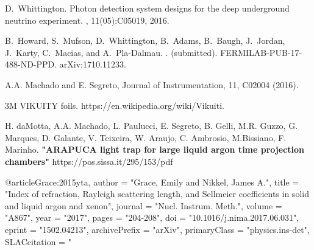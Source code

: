 



\begin{thebibliography}{1}
D.~Whittington.
\newblock Photon detection system designs for the deep underground neutrino
  experiment.
, 11(05):C05019, 2016.

B.~Howard, S.~Mufson, D.~Whittington, B.~Adams, B.~Baugh, J.~Jordan, J.~Karty,
  C.~Macias, and A.~Pla-Dalmau.
.
 (submitted).
\newblock FERMILAB-PUB-17-488-ND-PPD.
\newblock arXiv:1710.11233.

\end{thebibliography}





\begin{thebibliography}{99}
\footnotesize{

 A.A. Machado and E. Segreto, Journal of Instrumentation, 11, C02004 (2016).

	3M VIKUITY foils. https://en.wikipedia.org/wiki/Vikuiti.
    
 H. daMotta, A.A. Machado, L. Paulucci, E. Segreto, B. Gelli, M.R. Guzzo, G. Marques, D. Galante, V. Teixeira, W. Araujo, C. Ambrosio, M.Bissiano, F. Marinho. {\bf"ARAPUCA light trap for large liquid argon time projection chambers"}
    https://pos.sissa.it/295/153/pdf

}
\end{thebibliography}




@article{Grace:2015yta,
      author         = "Grace, Emily and Nikkel, James A.",
      title          = "{Index of refraction, Rayleigh scattering length, and
                        Sellmeier coefficients in solid and liquid argon and
                        xenon}",
      journal        = "Nucl. Instrum. Meth.",
      volume         = "A867",
      year           = "2017",
      pages          = "204-208",
      doi            = "10.1016/j.nima.2017.06.031",
      eprint         = "1502.04213",
      archivePrefix  = "arXiv",
      primaryClass   = "physics.ins-det",
      SLACcitation   = "%
}
